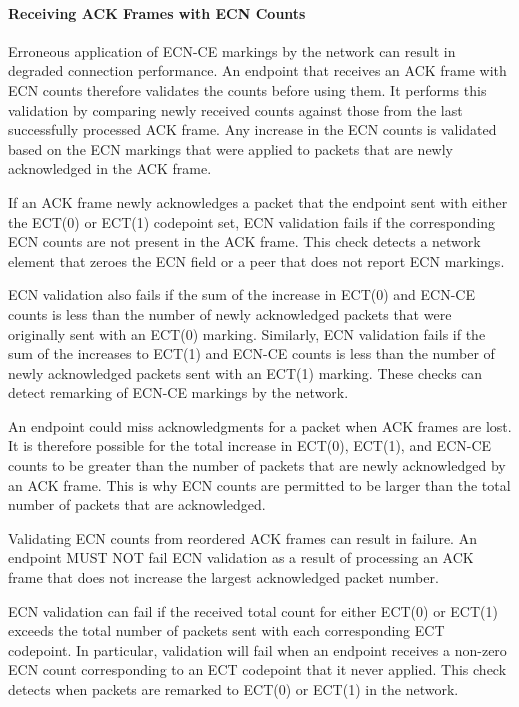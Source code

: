 \documentclass{article}
\begin{document}
\paragraph{Receiving ACK Frames with ECN Counts}

Erroneous application of ECN-CE markings by the network can result in degraded connection performance.  An endpoint that receives an ACK frame with ECN counts therefore validates the counts before using them.  It performs this validation by comparing newly received counts against those from the last successfully processed ACK frame.  Any increase in the ECN counts is validated based on the ECN markings that were applied to packets that are newly acknowledged in the ACK frame.

If an ACK frame newly acknowledges a packet that the endpoint sent with either the ECT(0) or ECT(1) codepoint set, ECN validation fails if the corresponding ECN counts are not present in the ACK frame. This check detects a network element that zeroes the ECN field or a peer that does not report ECN markings.

ECN validation also fails if the sum of the increase in ECT(0) and ECN-CE counts is less than the number of newly acknowledged packets that were originally sent with an ECT(0) marking.  Similarly, ECN validation fails if the sum of the increases to ECT(1) and ECN-CE counts is less than the number of newly acknowledged packets sent with an ECT(1) marking.  These checks can detect remarking of ECN-CE markings by the network.

An endpoint could miss acknowledgments for a packet when ACK frames are lost.  It is therefore possible for the total increase in ECT(0), ECT(1), and ECN-CE counts to be greater than the number of packets that are newly acknowledged by an ACK frame.  This is why ECN counts are permitted to be larger than the total number of packets that are acknowledged.

Validating ECN counts from reordered ACK frames can result in failure.  An endpoint MUST NOT fail ECN validation as a result of processing an ACK frame that does not increase the largest acknowledged packet number.

ECN validation can fail if the received total count for either ECT(0) or ECT(1) exceeds the total number of packets sent with each corresponding ECT codepoint.  In particular, validation will fail when an endpoint receives a non-zero ECN count corresponding to an ECT codepoint that it never applied.  This check detects when packets are remarked to ECT(0) or ECT(1) in the network.
\end{document}
